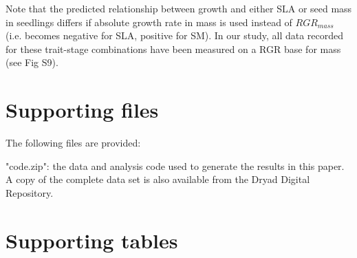 \documentclass[a4paper]{article}\usepackage[]{graphicx}\usepackage[]{color}
\begin{document}
Note that the predicted relationship between growth and either SLA or seed mass in seedlings differs if absolute growth rate in mass is used instead of $RGR_{mass}$ (i.e. becomes negative for SLA, positive for SM). In our study, all data recorded for these trait-stage combinations have been measured on a RGR base for mass (see Fig S9).

\newpage
\begin{appendices}\label{sec:appendices}
\renewcommand{\thefigure}{S\arabic{figure}}
\renewcommand{\thetable}{S\arabic{table}}

\setcounter{figure}{0}
\setcounter{table}{0}

\section{Supporting files}\label{app:supp_info_files}

The following files are provided:

"code.zip": the data and analysis code used to generate the results in this paper. A copy of the complete data set is also available from the Dryad Digital Repository.


\newpage
\section{Supporting tables}\label{app:supp_info_tables}

\linespread{1}


\end{appendices}
\end{document}
